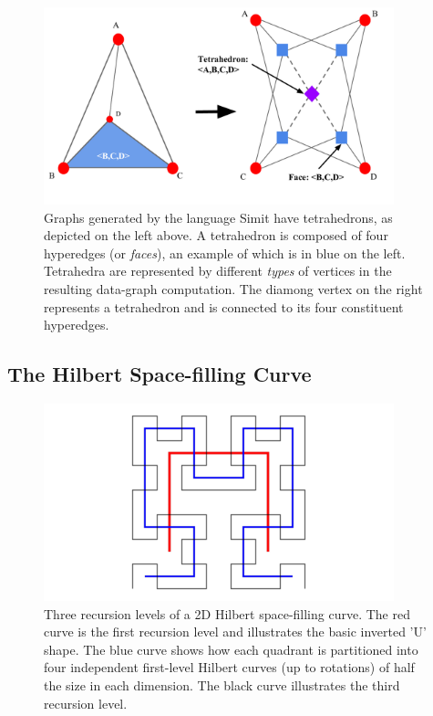 \begin{figure}[h]
\centering
\includegraphics[width=4in]{tetrahedron.pdf}
\caption{Graphs generated by the language Simit have tetrahedrons,
as depicted on the left above.  A tetrahedron is composed of four
hyperedges (or \emph{faces}), an example
of which is in blue on the left.  Tetrahedra are represented by different
\emph{types} of vertices in the resulting data-graph computation.
The diamong vertex on the right represents a tetrahedron and is 
connected to its four constituent hyperedges.}
\label{fig:tetrahedron}
\end{figure}



\subsection{The Hilbert Space-filling Curve}

\begin{figure}[!h]
\centering
\includegraphics[width=4in,clip,trim=0 0cm 0 0]{2d_hilbert.pdf}
\caption{Three recursion levels of a 2D Hilbert space-filling
curve.  The red curve is the first recursion level and illustrates 
the basic inverted 'U' shape.  The blue curve shows how each quadrant is
partitioned into four independent first-level Hilbert curves (up to 
rotations) of half the size in each dimension.  The black curve
illustrates the third recursion level.}
\label{fig:2d_hilbert}
\end{figure}

